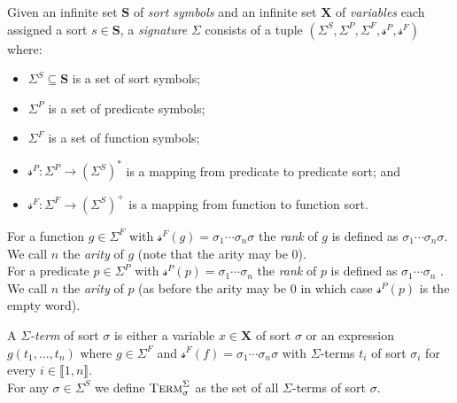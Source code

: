 \begin{definition}[Signature]
Given an infinite set $\mathbf{S}$ of \textit{sort symbols} and an infinite set $\mathbf{X}$ of \textit{variables} each assigned a sort $s\in\mathbf{S}$, a \textit{signature} $\Sigma$ consists of a tuple $\left(\Sigma^S, \Sigma^P, \Sigma^F, \mathcal{s}^P, \mathcal{s}^F \right)$ where:
\begin{itemize}
    \item $\Sigma^S \subseteq \mathbf{S}$ is a set of sort symbols;
    \item $\Sigma^P$ is a set of predicate symbols;
    \item $\Sigma^F$ is a set of function symbols;
    \item $\mathcal{s}^P\colon \Sigma^P \to \left(\Sigma^S\right)^\ast$ is a mapping from predicate to predicate sort; and
    \item $\mathcal{s}^F\colon \Sigma^F \to \left(\Sigma^S\right)^+$ is a mapping from function to function sort.
\end{itemize}
\end{definition}

\begin{definition}
For a function $g\in\Sigma^F$ with $\mathcal{s}^F(g)=\sigma_1\dotsi\sigma_n\sigma$ the \textit{rank} of $g$ is defined as $\sigma_1\dotsi\sigma_n\sigma$. We call $n$ the \textit{arity} of $g$ (note that the arity may be $0$).\\
For a predicate $p\in\Sigma^P$ with $\mathcal{s}^P(p)=\sigma_1\dotsi\sigma_n$ the \textit{rank} of $p$ is defined as $\sigma_1\dotsi\sigma_n$ . We call $n$ the \textit{arity} of $p$ (as before the arity may be $0$ in which case $\mathcal{s}^P(p)$ is the empty word).
\end{definition}

\begin{definition}
A \textit{$\Sigma$-term} of sort $\sigma$ is either a variable $x\in\mathbf{X}$ of sort $\sigma$ or an expression $g\left(t_1,\dots,t_n\right)$ where $g\in\Sigma^F$ and $\mathcal{s}^F(f)=\sigma_1\dotsi\sigma_n\sigma$ with $\Sigma$-terms $t_i$ of sort $\sigma_i$ for every $i\in\llbracket1,n\rrbracket$.\\
For any $\sigma\in\Sigma^S$ we define $\textsc{Term}^\Sigma_\sigma$ as the set of all $\Sigma$-terms of sort $\sigma$.
\end{definition}

